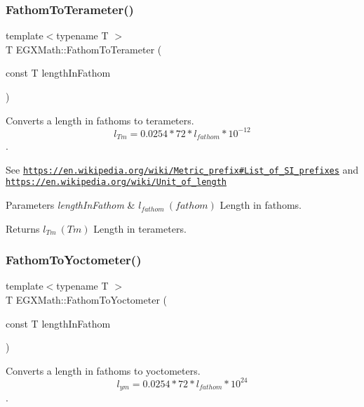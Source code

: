 \subsubsection{\texorpdfstring{Fathom\+To\+Terameter()}{FathomToTerameter()}}
{\footnotesize\ttfamily template$<$typename T $>$ \\
T E\+G\+X\+Math\+::\+Fathom\+To\+Terameter (\begin{DoxyParamCaption}\item[{const T}]{length\+In\+Fathom }\end{DoxyParamCaption})}



Converts a length in fathoms to terameters. \[ l_{Tm}=0.0254 * 72 * l_{fathom} * 10^{-12} \]. 

See \href{https://en.wikipedia.org/wiki/Metric_prefix#List_of_SI_prefixes}{\tt https\+://en.\+wikipedia.\+org/wiki/\+Metric\+\_\+prefix\#\+List\+\_\+of\+\_\+\+S\+I\+\_\+prefixes} and \href{https://en.wikipedia.org/wiki/Unit_of_length}{\tt https\+://en.\+wikipedia.\+org/wiki/\+Unit\+\_\+of\+\_\+length} 
\begin{DoxyParams}{Parameters}
{\em length\+In\+Fathom} & $ l_{fathom}\ (fathom)$ Length in fathoms. \\
\hline
\end{DoxyParams}
\begin{DoxyReturn}{Returns}
$ l_{Tm}\ (Tm)$ Length in terameters. 
\end{DoxyReturn}
\mbox{\label{group___e_g_x_math-_conversions-_length_conversions-_imperial-_fathom-_s_i_ga0b22b9db2c224dadfd62934797f14090}} 
\subsubsection{\texorpdfstring{Fathom\+To\+Yoctometer()}{FathomToYoctometer()}}
{\footnotesize\ttfamily template$<$typename T $>$ \\
T E\+G\+X\+Math\+::\+Fathom\+To\+Yoctometer (\begin{DoxyParamCaption}\item[{const T}]{length\+In\+Fathom }\end{DoxyParamCaption})}



Converts a length in fathoms to yoctometers. \[ l_{ym}=0.0254 * 72 * l_{fathom} * 10^{24} \]. 

